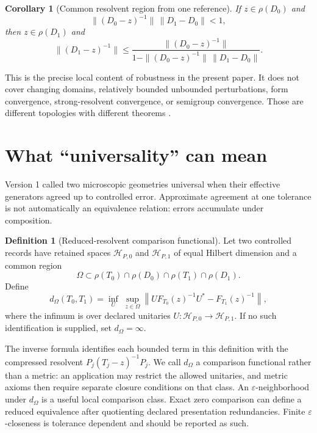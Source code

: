 \documentclass[11pt]{article}
\newtheorem{corollary}[theorem]{Corollary}
\theoremstyle{definition}
\newtheorem{definition}[theorem]{Definition}
\theoremstyle{remark}
\newcommand{\cH}{\mathcal H}
\newcommand{\1}{\mathbf 1}
\begin{document}
\begin{corollary}[Common resolvent region from one reference]
\label{cor:neumann}
If \(z\in\rho(D_0)\) and
\[
 \|(D_0-z)^{-1}\|\,\|D_1-D_0\|<1,
\]
then \(z\in\rho(D_1)\) and
\[
\|(D_1-z)^{-1}\|
\leq
\frac{\|(D_0-z)^{-1}\|}
 {1-\|(D_0-z)^{-1}\|\,\|D_1-D_0\|}.
\]
\end{corollary}

This is the precise local content of robustness in the present paper.  It
does not cover changing domains, relatively bounded unbounded
perturbations, form convergence, strong-resolvent convergence, or
semigroup convergence.  Those are different topologies with different
theorems \cite{Kato1995,ReedSimonI1980}.

\section{What ``universality'' can mean}
\label{sec:universality}

Version 1 called two microscopic geometries universal when their effective
generators agreed up to controlled error.  Approximate agreement at one
tolerance is not automatically an equivalence relation: errors accumulate
under composition.

\begin{definition}[Reduced-resolvent comparison functional]
Let two controlled records have retained spaces
\(\cH_{P,0}\) and \(\cH_{P,1}\) of equal Hilbert dimension and a common
region
\[
  \Omega\subset
  \rho(T_0)\cap\rho(D_0)\cap\rho(T_1)\cap\rho(D_1).
\]
Define
\[
d_\Omega(T_0,T_1)
=
\inf_U\;
\sup_{z\in\Omega}
\left\|
 U F_{T_0}(z)^{-1}U^*-F_{T_1}(z)^{-1}
\right\|,
\]
where the infimum is over declared unitaries
\(U:\cH_{P,0}\to\cH_{P,1}\).  If no such identification is supplied, set
\(d_\Omega=\infty\).
\end{definition}

The inverse formula identifies each bounded term in this definition with
the compressed resolvent \(P_j(T_j-z)^{-1}P_j\).  We call \(d_\Omega\) a
comparison functional rather than a metric: an application may restrict
the allowed unitaries, and metric axioms then require separate closure
conditions on that class.
An \(\varepsilon\)-neighborhood under \(d_\Omega\) is a useful local
comparison class.  Exact zero comparison can define a reduced
equivalence after quotienting declared presentation redundancies.  Finite
\(\varepsilon\)-closeness is tolerance dependent and should be reported as
such.
\end{document}
